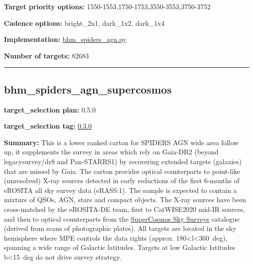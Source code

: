 \noindent\textbf{Target priority options:}
1550-1553,1750-1753,3550-3553,3750-3752

\noindent\textbf{Cadence options:} bright\_2x1, dark\_1x2, dark\_1x4

\noindent\textbf{Implementation:}
\href{https://github.com/sdss/target_selection/blob/0.3.0/python/target_selection/cartons/bhm_spiders_agn.py}{bhm\_spiders\_agn.py}

\noindent\textbf{Number of targets:} 82683

\begin{center}\rule{0.5\linewidth}{0.5pt}\end{center}

\hypertarget{bhm_spiders_agn_supercosmos_plan0.5.0}{%
\subsection{bhm\_spiders\_agn\_supercosmos}\label{bhm_spiders_agn_supercosmos_plan0.5.0}}

\noindent\textbf{target\_selection plan:} 0.5.0

\noindent\textbf{target\_selection tag:}
\href{https://github.com/sdss/target_selection/tree/0.3.0/}{0.3.0}

\noindent\textbf{Summary:} This is a lower ranked carton for SPIDERS AGN wide
area follow up, it supplements the survey in areas which rely on
Gaia-DR2 (beyond legacysurvey/dr8 and Pan-STARRS1) by recovering
extended targets (galaxies) that are missed by Gaia. The carton provides
optical counterparts to point-like (unresolved) X-ray sources detected
in early reductions of the first 6-months of eROSITA all sky survey data
(eRASS:1). The sample is expected to contain a mixture of QSOs, AGN,
stars and compact objects. The X-ray sources have been cross-matched by
the eROSITA-DE team, first to
CatWISE2020 \citep{Marocco2021}
mid-IR sources, and then to optical counterparts from the
\href{http://www-wfau.roe.ac.uk/sss/intro.html}{SuperCosmos Sky Surveys}
catalogue (derived from scans of photographic plates). All targets are
located in the sky hemisphere where MPE controls the data rights
(approx. 180\textless l\textless360~deg), spanning a wide range of
Galactic latitudes. Targets at low Galactic latitudes
\textbar b\textbar\textless15~deg do not drive survey strategy.

